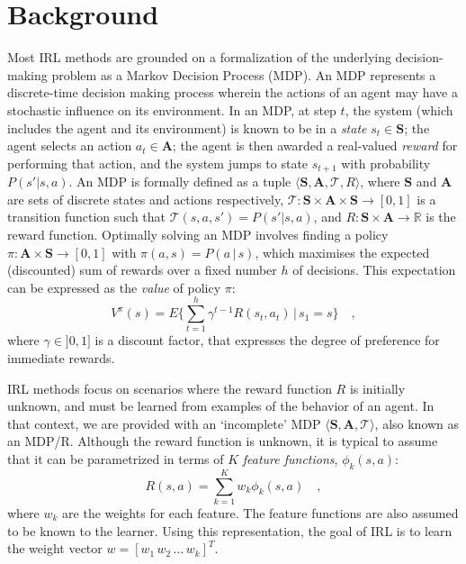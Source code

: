 \documentclass[letterpaper]{article}
\begin{document}
\section{Background}
Most IRL methods are grounded on a formalization of the underlying decision-making problem as a Markov Decision Process (MDP). An MDP represents a discrete-time decision making process wherein the actions of an agent may have a stochastic influence on its environment. In an MDP, at step $t$, the system (which includes the agent and its environment) is known to be in a \emph{state} $s_t\in\mathbf{S}$; the agent selects an action $a_t\in\mathbf{A}$; the agent is then awarded a real-valued \emph{reward} for performing that action, and the system jumps to state $s_{t+1}$ with probability $P(s'|s,a)$. An MDP is formally defined as a tuple $\langle\mathbf{S},\mathbf{A},\mathcal{T},R\rangle$, where $\mathbf{S}$ and $\mathbf{A}$ are sets of discrete states and actions respectively, $\mathcal{T}:\mathbf{S}\times\mathbf{A}\times\mathbf{S}\rightarrow [0,1]$ is a transition function such that $\mathcal T(s,a,s')=P(s'|s,a)$, and $R:\mathbf{S}\times\mathbf{A}\rightarrow\mathbb R$ is the reward function. 
Optimally solving an MDP involves finding a policy $\pi:\mathbf{A}\times\mathbf{S}\rightarrow[0,1]$ with $\pi(a,s) = P(a\,|\,s)$, which maximises the expected (discounted) sum of rewards over a fixed number $h$ of decisions. This expectation can be expressed as the \emph{value} of policy $\pi$:
\begin{equation}
\label{eq:value}
 V^\pi(s) = E\{\sum_{t = 1}^h \gamma^{t-1}R(s_t,a_t)\,\vert\, s_1 = s\} \quad,
\end{equation}
where $\gamma\in]0,1]$ is a discount factor, that expresses the degree of preference for immediate rewards.

IRL methods focus on scenarios where the reward function $R$ is initially unknown, and must be learned from examples of the behavior of an agent. In that context, we are provided with an `incomplete' MDP $\langle\mathbf{S},\mathbf{A},\mathcal{T}\rangle$, also known as an MDP/R. Although the reward function is unknown, it is typical to assume that it can be parametrized in terms of $K$ \emph{feature functions}, $\phi_k(s,a)$:
\begin{equation}
R(s,a) = \sum_{k=1}^Kw_k\phi_k(s,a)\quad, \label{eq:rew}
\end{equation}
where $w_k$ are the weights for each feature. The feature functions are also assumed to be known to the learner. Using this representation, the goal of IRL is to learn the weight vector $w=[w_1\,w_2\,\ldots\,w_k]^T$.
\end{document}
